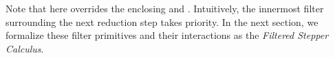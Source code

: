 Note that  here overrides the enclosing 
and . Intuitively, the innermost filter surrounding
the next reduction step takes priority.
In the next section, we formalize these filter primitives and their
interactions as the \emph{Filtered Stepper Calculus}.










